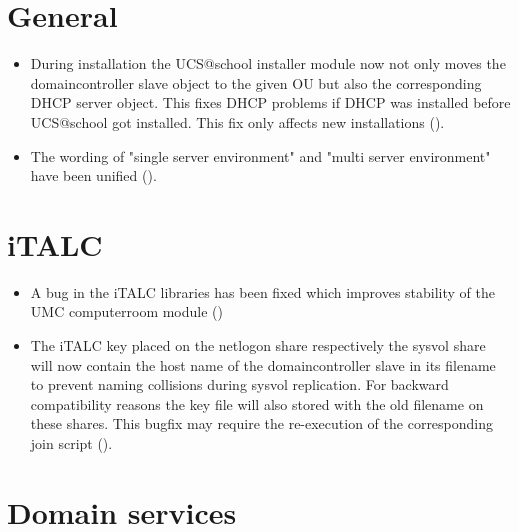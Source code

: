 \section{General}
\begin{itemize}
\item During installation the UCS@school installer module now not only moves the domaincontroller slave object
  to the given OU but also the corresponding DHCP server object. This fixes DHCP problems if DHCP was
  installed before UCS@school got installed. This fix only affects new installations ().
\item The wording of "single server environment" and "multi server environment" have been unified ().
\end{itemize}

 
\section{iTALC}
\begin{itemize}
\item A bug in the iTALC libraries has been fixed which improves stability of the UMC computerroom module ()
\item The iTALC key placed on the netlogon share respectively the sysvol share will now contain the host name
      of the domaincontroller slave in its filename to prevent naming collisions during sysvol replication. 
      For backward compatibility reasons the key file will also stored with the old filename on these shares. This
      bugfix may require the re-execution of the corresponding join script ().
\end{itemize}

\section{Domain services}


